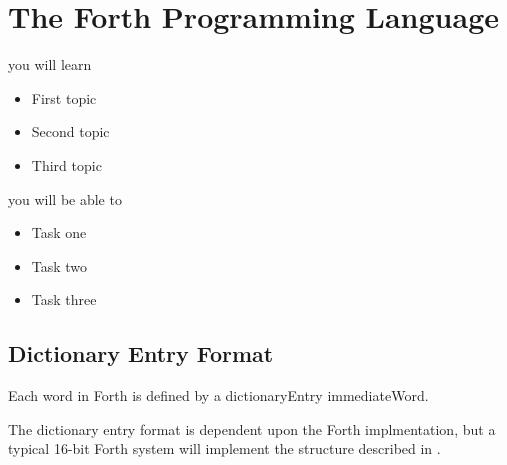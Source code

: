 \setchapterpreamble[u]{\margintoc}
\chapter{The Forth Programming Language}

%
\begin{kaobox}[frametitle=In This Chapter]
you will learn
\begin{itemize}
	\item First topic
	\item Second topic
        \item Third topic
\end{itemize}

you will be able to
\begin{itemize}
        \item Task one
        \item Task two
        \item Task three
\end{itemize}
\end{kaobox}

\blindtext

%
\section{Dictionary Entry Format}

Each word in Forth is defined by a \gls{dictionaryEntry}
\gls{immediateWord}.



The dictionary entry format is dependent upon the Forth implmentation, but a typical
16-bit Forth system will implement the structure described in .


